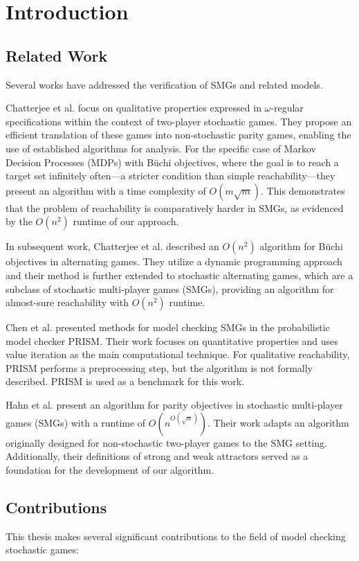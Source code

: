 \chapter{Introduction}


\section{Related Work}
Several works have addressed the verification of SMGs and related models.


Chatterjee et al. \cite{chatterjee_simple_2003} focus on qualitative properties expressed in $\omega$-regular specifications within the context of two-player stochastic games. They propose an efficient translation of these games into non-stochastic parity games, enabling the use of established algorithms for analysis. For the specific case of Markov Decision Processes (MDPs) with Büchi objectives, where the goal is to reach a target set infinitely often---a stricter condition than simple reachability---they present an algorithm with a time complexity of $O(m \sqrt{m})$. This demonstrates that the problem of reachability is comparatively harder in SMGs, as evidenced by the $O(n^2)$ runtime of our approach.

In subsequent work, Chatterjee et al. \cite{chatterjee_on2_2011} described an $O(n^2)$ algorithm for Büchi objectives in alternating games. They utilize a dynamic programming approach and their method is further extended to stochastic alternating games, which are a subclass of stochastic multi-player games (SMGs), providing an algorithm for almost-sure reachability with $O(n^2)$ runtime.

Chen et al. \cite{chen_automatic_2013, chen_automatic_2013-1} presented methods for model checking SMGs in the probabilistic model checker PRISM. Their work focuses on quantitative properties and uses value iteration as the main computational technique. For qualitative reachability, PRISM performs a preprocessing step, but the algorithm is not formally described. PRISM is used as a benchmark for this work.

Hahn et al. \cite{chaudhuri_simple_2016} present an algorithm for parity objectives in stochastic multi-player games (SMGs) with a runtime of $O(n^{O(\sqrt{n})})$. Their work adapts an algorithm originally designed for non-stochastic two-player games to the SMG setting. Additionally, their definitions of strong and weak attractors served as a foundation for the development of our algorithm.


\section{Contributions}
This thesis makes several significant contributions to the field of model checking stochastic games:

